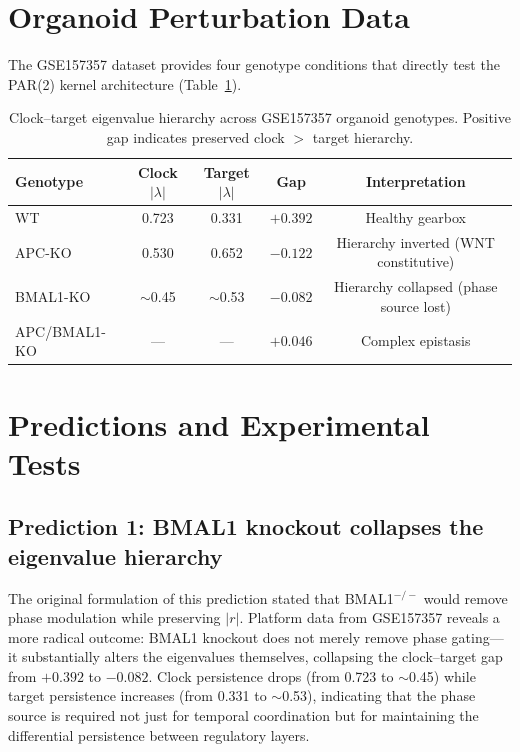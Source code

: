 \documentclass[11pt,letterpaper]{article}
\theoremstyle{definition}
\theoremstyle{remark}
\begin{document}
\section{Organoid Perturbation Data}
\label{sec:organoid}

The GSE157357 dataset provides four genotype conditions that directly test the PAR(2) kernel architecture (Table~\ref{tab:organoid}).

\begin{table}[H]
\centering
\caption{Clock--target eigenvalue hierarchy across GSE157357 organoid genotypes. Positive gap indicates preserved clock $>$ target hierarchy.}
\label{tab:organoid}
\begin{tabular}{lcccc}
\toprule
\textbf{Genotype} & \textbf{Clock $|\lambda|$} & \textbf{Target $|\lambda|$} & \textbf{Gap} & \textbf{Interpretation} \\
\midrule
WT & 0.723 & 0.331 & $+0.392$ & Healthy gearbox \\
APC-KO & 0.530 & 0.652 & $-0.122$ & Hierarchy inverted (WNT constitutive) \\
BMAL1-KO & $\sim$0.45 & $\sim$0.53 & $-0.082$ & Hierarchy collapsed (phase source lost) \\
APC/BMAL1-KO & --- & --- & $+0.046$ & Complex epistasis \\
\bottomrule
\end{tabular}
\end{table}

\section{Predictions and Experimental Tests}

\subsection{Prediction 1: BMAL1 knockout collapses the eigenvalue hierarchy}
\label{sec:bmal1ko}

The original formulation of this prediction stated that BMAL1$^{-/-}$ would remove phase modulation while preserving $|r|$. Platform data from GSE157357 reveals a more radical outcome: BMAL1 knockout does not merely remove phase gating---it substantially alters the eigenvalues themselves, collapsing the clock--target gap from $+0.392$ to $-0.082$. Clock persistence drops (from 0.723 to $\sim$0.45) while target persistence increases (from 0.331 to $\sim$0.53), indicating that the phase source is required not just for temporal coordination but for maintaining the differential persistence between regulatory layers.
\end{document}

